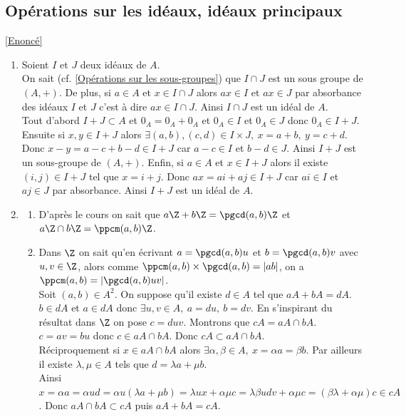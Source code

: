 \documentclass[8pt]{book}
\begin{document}
	\subsection{Opérations sur les idéaux, idéaux principaux }
	\label{Opérations sur les idéaux, idéaux principaux corrigé}
	\textcolor{blue}{\hyperref[Opérations sur les idéaux, idéaux principaux]{[Enoncé]}}\\
	\begin{enumerate}
		\item Soient $I$ et $J$ deux idéaux de $A$.\\
		On sait (cf. \ref{Opérations sur les sous-groupes}) que $I\cap J$ est un sous groupe de $(A,+)$. De plus, si $a\in A$ et $x\in I\cap J$ alors $ax\in I$ et $ax\in J$ par absorbance des idéaux $I$ et $J$ c'est à dire $ax\in I\cap J$. Ainsi $I\cap J$ est un idéal de $A$.\\
		Tout d'abord $I+J\subset A$ et $0_A=0_A+0_A$ et $0_A\in I$ et $0_A\in J$ donc $0_A\in I+J$.\\
		Ensuite si $x,y\in I+J$ alors $\exists (a,b),(c,d)\in I\times J,\ x=a+b,\ y=c+d$. Donc $x-y=a-c+b-d\in I+J$ car $a-c\in I$ et $b-d\in J$. Ainsi $I+J$ est un sous-groupe de $(A,+)$. Enfin, si $a\in A$ et $x\in I+J$ alors il existe $(i,j)\in I+J$ tel que $x=i+j$. Donc $ax=ai+aj\in I+J$ car $ai\in I$ et $aj\in J$ par absorbance. Ainsi $I+J$ est un idéal de $A$.
		\item \begin{enumerate}[label=\alph*.]
			\item D'après le cours on sait que $a\Z+b\Z=\pgcd(a,b)\Z$ et $a\Z\cap b\Z=\ppcm(a,b)\Z$.
			\item Dans $\Z$ on sait qu'en écrivant $a=\pgcd(a,b)u$ et $b=\pgcd(a,b)v$ avec $u,v\in \Z$, alors comme $\ppcm(a,b)\times\pgcd(a,b)=|ab|$, on a $\ppcm(a,b)=|\pgcd(a,b)uv|$.\\ 
			Soit $(a,b)\in A^2$. On suppose qu'il existe $d\in A$ tel que $aA+bA=dA$. $b\in dA$ et $a\in dA$ donc $\exists u,v\in A,\ a=du,\ b=dv$. En s'inspirant du résultat dans $\Z$ on pose $c=duv$. Montrons que $cA=aA\cap bA$.\\
			$c=av=bu$ donc $c\in aA\cap bA$. Donc $cA\subset aA\cap bA$.\\
			Réciproquement si $x\in aA\cap bA$ alors $\exists \alpha,\beta\in A,\ x=\alpha a=\beta b$. Par ailleurs il existe $\lambda,\mu\in A$ tels que $d=\lambda a+\mu b$.\\
			Ainsi $x=\alpha a=\alpha ud=\alpha u(\lambda a+\mu b)=\lambda ux+\alpha\mu c=\lambda\beta udv+\alpha\mu c=(\beta\lambda+\alpha\mu)c\in cA$. Donc $aA\cap bA\subset cA$ puis $aA+bA=cA$.
		\end{enumerate}
	\end{enumerate}
	
\end{document}
